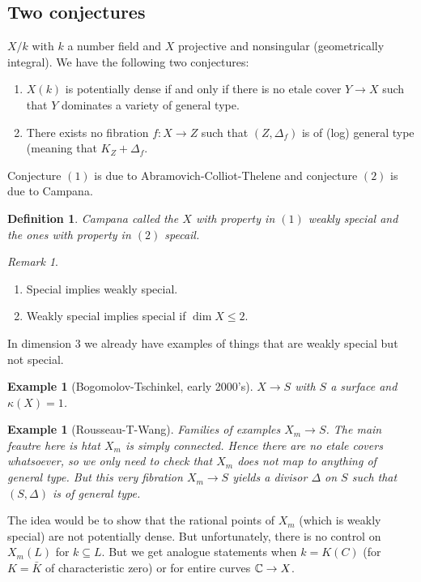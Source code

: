 \documentclass[A4paper, british, reqno]{amsart}
\theoremstyle{darkgreentheorem}
\theoremstyle{darkbluedefinition}
\newtheorem{defn}[thm]{Definition}
\theoremstyle{darkredexample}
\newtheorem{exa}[thm]{Example}
\theoremstyle{remark}
\newtheorem{rem}[thm]{Remark}
\newcommand{\1}{\mathbbm{1}}
\newcommand{\sub}{\subseteq}
\begin{document}
\subsection{Two conjectures}

$X/k$ with $k$ a number field and $X$ projective and nonsingular (geometrically integral).
We have the following two conjectures:

\begin{enumerate}
    \item $X(k)$ is potentially dense if and only if there is no etale cover $Y\to X$ such that $Y$ dominates a variety of general type.
    \item There exists no fibration $f\colon X\to Z$ such that $(Z,\Delta_{f})$ is of (log) general type (meaning that $K_{Z}+\Delta_{f}$.
\end{enumerate}

Conjecture $(1)$ is due to Abramovich-Colliot-Thelene and conjecture $(2)$ is due to Campana.

\begin{defn}
    Campana called the $X$ with property in $(1)$ \textit{weakly special} and the ones with property in $(2)$ \textit{specail}.
\end{defn}

\begin{rem}
    \begin{enumerate}
	\item Special implies weakly special.
	\item Weakly special implies special  if $\dim{X}\leqslant 2$.
    \end{enumerate}
\end{rem}

In dimension $3$ we already have examples of things that are weakly special but not special.
\begin{exa}[Bogomolov-Tschinkel, early 2000's]
    $X\to S$ with $S$ a surface and $\kappa(X)=1$.
\end{exa}

\begin{exa}[Rousseau-T-Wang]
    Families of examples $X_{m}\to S$.
    The main feautre here is htat $X_{m}$ is simply connected.
    Hence there are no etale covers whatsoever, so we only need to check that $X_{m}$ does not map to anything of general type.
    But this very fibration $X_{m}\to S$ yields a divisor $\Delta$ on $S$ such that $(S,\Delta)$ is of general type.
\end{exa}

The idea would be to show that the rational points of $X_{m}$ (which is weakly special) are not potentially dense.
But unfortunately, there is no control on $X_{m}(L)$ for $k\sub L$.
But we get analogue statements when $k=K(C)$ (for $K=\bar{K}$ of characteristic zero) or for entire curves $\mathbb{C}\to X$.
\end{document}

